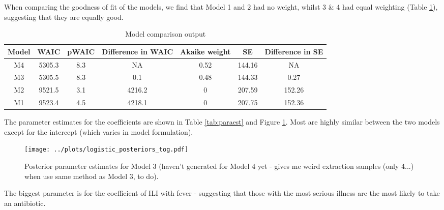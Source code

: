 \documentclass{article}
\begin{document}
When comparing the goodness of fit of the models, we find that Model 1 and 2 had no weight, whilst 3 \& 4 had equal weighting (Table \ref{tab:modelcomparison}), suggesting that they are equally good. 

\begin{table}[h]
  \centering
\begin{tabular}{ | c | c | c |c |c |c |c |  }
  \hline			
  Model & WAIC & pWAIC & Difference in WAIC & Akaike weight & SE & Difference in SE \\
  \hline \hline
  M4 & 5305.3 & 8.3 & NA & 0.52 & 144.16 & NA \\
  M3 & 5305.5 & 8.3 & 0.1 & 0.48 & 144.33 & 0.27\\
  M2 & 9521.5 & 3.1 & 4216.2 & 0 & 207.59 & 152.26\\
  M1 & 9523.4 & 4.5 & 4218.1 & 0 & 207.75 & 152.36\\
  \hline  
\end{tabular}
\caption{Model comparison output}
\label{tab:modelcomparison}
\end{table}

The parameter estimates for the coefficients are shown in Table \ref{tab:paraest} and Figure \ref{fig:logpost}. Most are highly similar between the two models except for the intercept (which varies in model formulation). 

\begin{figure}[htbp]
	\centering
	\texttt{[image: ../plots/logistic\_posteriors\_tog.pdf]}
	\caption{Posterior parameter estimates for Model 3 (haven't generated for Model 4 yet - gives me weird extraction samples (only 4...) when use same method as Model 3, to do).}
	\label{fig:logpost}
\end{figure}

The biggest parameter is for the coefficient of ILI with fever - suggesting that those with the most serious illness are the most likely to take an antibiotic.
\end{document}
